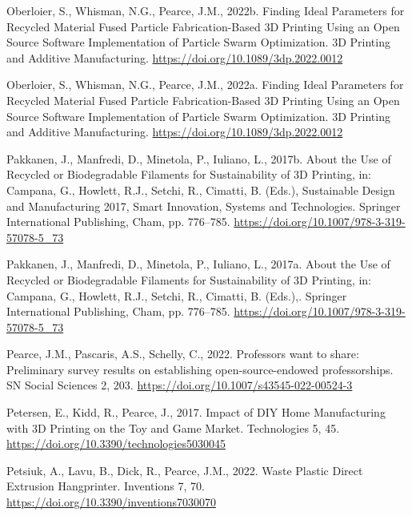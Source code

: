 \documentclass[
  12pt,
  number,
  review]{elsarticle}
\newlength{\cslhangindent}
\newlength{\cslentryspacingunit} %
\newenvironment{CSLReferences}[2] %
 {%
  \setlength{\parindent}{0pt}
  \ifodd #1
  \let\oldpar\par
  \def\par{\hangindent=\cslhangindent\oldpar}
  \fi
  \setlength{\parskip}{#2\cslentryspacingunit}
 }%
 {}
\begin{document}
\begin{CSLReferences}{1}{0}
\leavevmode{}%
Oberloier, S., Whisman, N.G., Pearce, J.M., 2022b. Finding {Ideal
Parameters} for {Recycled Material Fused Particle Fabrication-Based 3D
Printing Using} an {Open Source Software Implementation} of {Particle
Swarm Optimization}. 3D Printing and Additive Manufacturing.
\url{https://doi.org/10.1089/3dp.2022.0012}

\leavevmode{}%
Oberloier, S., Whisman, N.G., Pearce, J.M., 2022a. Finding {Ideal
Parameters} for {Recycled Material Fused Particle Fabrication-Based 3D
Printing Using} an {Open Source Software Implementation} of {Particle
Swarm Optimization}. 3D Printing and Additive Manufacturing.
\url{https://doi.org/10.1089/3dp.2022.0012}

\leavevmode{}%
Pakkanen, J., Manfredi, D., Minetola, P., Iuliano, L., 2017b. About the
{Use} of {Recycled} or {Biodegradable Filaments} for {Sustainability} of
{3D Printing}, in: Campana, G., Howlett, R.J., Setchi, R., Cimatti, B.
(Eds.), Sustainable {Design} and {Manufacturing} 2017, Smart
{Innovation}, {Systems} and {Technologies}. {Springer International
Publishing}, {Cham}, pp. 776--785.
\url{https://doi.org/10.1007/978-3-319-57078-5_73}

\leavevmode{}%
Pakkanen, J., Manfredi, D., Minetola, P., Iuliano, L., 2017a. About the
{Use} of {Recycled} or {Biodegradable Filaments} for {Sustainability} of
{3D Printing}, in: Campana, G., Howlett, R.J., Setchi, R., Cimatti, B.
(Eds.),. {Springer International Publishing}, {Cham}, pp. 776--785.
\url{https://doi.org/10.1007/978-3-319-57078-5_73}

\leavevmode{}%
Pearce, J.M., Pascaris, A.S., Schelly, C., 2022. Professors want to
share: Preliminary survey results on establishing open-source-endowed
professorships. SN Social Sciences 2, 203.
\url{https://doi.org/10.1007/s43545-022-00524-3}

\leavevmode{}%
Petersen, E., Kidd, R., Pearce, J., 2017. Impact of {DIY Home
Manufacturing} with {3D Printing} on the {Toy} and {Game Market}.
Technologies 5, 45. \url{https://doi.org/10.3390/technologies5030045}

\leavevmode{}%
Petsiuk, A., Lavu, B., Dick, R., Pearce, J.M., 2022. Waste {Plastic
Direct Extrusion Hangprinter}. Inventions 7, 70.
\url{https://doi.org/10.3390/inventions7030070}


\end{CSLReferences}
\end{document}
